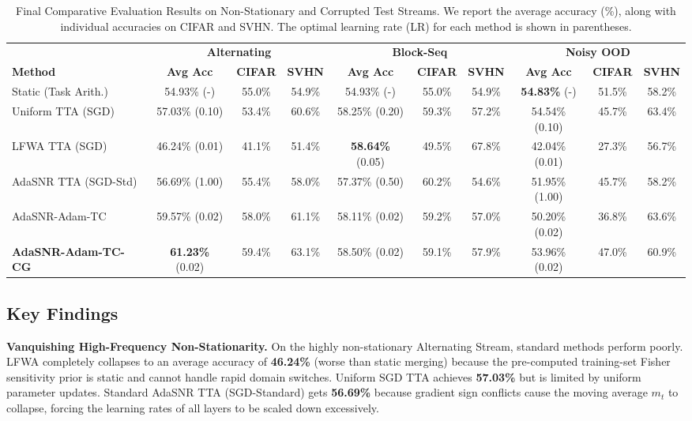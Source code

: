 \documentclass{article}
\theoremstyle{plain}
\theoremstyle{definition}
\theoremstyle{remark}
\begin{document}
\begin{table}[t]
\caption{Final Comparative Evaluation Results on Non-Stationary and Corrupted Test Streams. We report the average accuracy (\%), along with individual accuracies on CIFAR and SVHN. The optimal learning rate (LR) for each method is shown in parentheses.}
\label{tab:results}
\vskip 0.15in
\begin{center}
\begin{small}
\setlength{\tabcolsep}{1.5pt}
\begin{tabular}{l|ccc|ccc|ccc}
\toprule
& \multicolumn{3}{c|}{\textbf{Alternating}} & \multicolumn{3}{c|}{\textbf{Block-Seq}} & \multicolumn{3}{c}{\textbf{Noisy OOD}} \\
\textbf{Method} & \textbf{Avg Acc} & \textbf{CIFAR} & \textbf{SVHN} & \textbf{Avg Acc} & \textbf{CIFAR} & \textbf{SVHN} & \textbf{Avg Acc} & \textbf{CIFAR} & \textbf{SVHN} \\
\midrule
Static (Task Arith.) & 54.93\% (-) & 55.0\% & 54.9\% & 54.93\% (-) & 55.0\% & 54.9\% & \textbf{54.83\%} (-) & 51.5\% & 58.2\% \\
Uniform TTA (SGD) & 57.03\% (0.10) & 53.4\% & 60.6\% & 58.25\% (0.20) & 59.3\% & 57.2\% & 54.54\% (0.10) & 45.7\% & 63.4\% \\
LFWA TTA (SGD) & 46.24\% (0.01) & 41.1\% & 51.4\% & \textbf{58.64\%} (0.05) & 49.5\% & 67.8\% & 42.04\% (0.01) & 27.3\% & 56.7\% \\
AdaSNR TTA (SGD-Std) & 56.69\% (1.00) & 55.4\% & 58.0\% & 57.37\% (0.50) & 60.2\% & 54.6\% & 51.95\% (1.00) & 45.7\% & 58.2\% \\
AdaSNR-Adam-TC & 59.57\% (0.02) & 58.0\% & 61.1\% & 58.11\% (0.02) & 59.2\% & 57.0\% & 50.20\% (0.02) & 36.8\% & 63.6\% \\
\textbf{AdaSNR-Adam-TC-CG} & \textbf{61.23\%} (0.02) & 59.4\% & 63.1\% & 58.50\% (0.02) & 59.1\% & 57.9\% & 53.96\% (0.02) & 47.0\% & 60.9\% \\
\bottomrule
\end{tabular}
\end{small}
\end{center}
\vskip -0.1in
\end{table}

\subsection{Key Findings}
\textbf{Vanquishing High-Frequency Non-Stationarity.} On the highly non-stationary Alternating Stream, standard methods perform poorly. LFWA completely collapses to an average accuracy of \textbf{46.24\%} (worse than static merging) because the pre-computed training-set Fisher sensitivity prior is static and cannot handle rapid domain switches. Uniform SGD TTA achieves \textbf{57.03\%} but is limited by uniform parameter updates.
Standard AdaSNR TTA (SGD-Standard) gets \textbf{56.69\%} because gradient sign conflicts cause the moving average $m_t$ to collapse, forcing the learning rates of all layers to be scaled down excessively.
\end{document}
